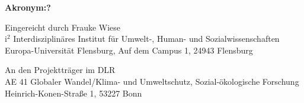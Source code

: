 \begin{center}
{\textbf{\textsf{}}
}

{\Huge
\textbf{\textsf{Akronym:{?}}}
}

\vspace{1cm}

Eingereicht durch
Frauke Wiese\\
i$^{2}$ Interdisziplinäres Institut für Umwelt-, Human- und Sozialwissenschaften\\
Europa-Universität Flensburg, Auf dem Campus 1, 24943 Flensburg


\vspace{0.5cm}

An den Projektträger im DLR \\
AE 41 Globaler Wandel/Klima- und Umweltschutz, Sozial-ökologische Forschung \\
Heinrich-Konen-Straße 1, 53227 Bonn


\end{center}

\clearpage